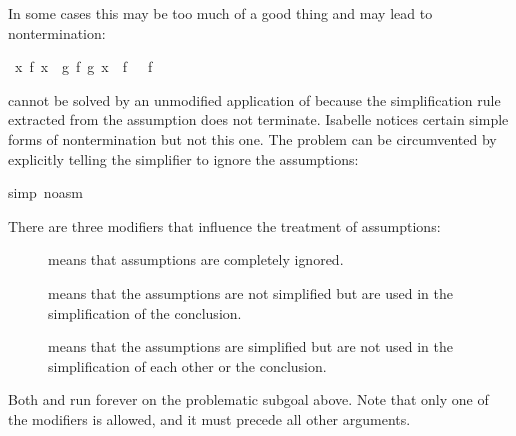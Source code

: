 \begin{isabellebody}
\begin{isamarkuptext}
In some cases this may be too much of a good thing and may lead to
nontermination:%
\end{isamarkuptext}%
\ {\isachardoublequote}{\isasymforall}x{\isachardot}\ f\ x\ {\isacharequal}\ g\ {\isacharparenleft}f\ {\isacharparenleft}g\ x{\isacharparenright}{\isacharparenright}\ {\isasymLongrightarrow}\ f\ {\isacharbrackleft}{\isacharbrackright}\ {\isacharequal}\ f\ {\isacharbrackleft}{\isacharbrackright}\ {\isacharat}\ {\isacharbrackleft}{\isacharbrackright}{\isachardoublequote}%
\begin{isamarkuptxt}%
\noindent
cannot be solved by an unmodified application of  because the
simplification rule  extracted from the assumption
does not terminate. Isabelle notices certain simple forms of
nontermination but not this one. The problem can be circumvented by
explicitly telling the simplifier to ignore the assumptions:%
\end{isamarkuptxt}%
simp\ {\isacharparenleft}no{\isacharunderscore}asm{\isacharparenright}{\isacharparenright}\isanewline
{}%
\begin{isamarkuptext}%
\noindent
There are three modifiers that influence the treatment of assumptions:
\begin{description}
\item[]
 means that assumptions are completely ignored.
\item[]
 means that the assumptions are not simplified but
  are used in the simplification of the conclusion.
\item[]
 means that the assumptions are simplified but are not
  used in the simplification of each other or the conclusion.
\end{description}
Both  and  run forever on
the problematic subgoal above.
Note that only one of the modifiers is allowed, and it must precede all
other arguments.


\end{isamarkuptext}
\end{isabellebody}
